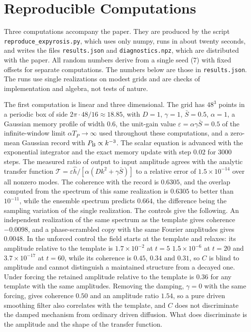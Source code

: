 \documentclass[11pt]{article}
\theoremstyle{definition}
\theoremstyle{remark}
\newcommand{\TT}{\mathcal{T}}
\newcommand{\Sb}{\bar{S}}
\begin{document}
\section{Reproducible Computations}\label{sec:computations}

Three computations accompany the paper. They are produced by the script \texttt{reproduce\_expyrosis.py}, which uses only numpy, runs in about twenty seconds, and writes the files \texttt{results.json} and \texttt{diagnostics.npz}, which are distributed with the paper. All random numbers derive from a single seed (7) with fixed offsets for separate computations. The numbers below are those in \texttt{results.json}. The runs use single realizations on modest grids and are checks of implementation and algebra, not tests of nature.

The first computation is linear and three dimensional. The grid has $48^3$ points in a periodic box of side $2\pi\cdot48/16\approx18.85$, with $D=1$, $\gamma=1$, $\Sb=0.5$, $\alpha=1$, a Gaussian memory profile of width $0.6$, the unit-gain value $\varepsilon=\alpha\gamma\Sb=0.5$ of the infinite-window limit $\alpha T_P\to\infty$ used throughout these computations, and a zero-mean Gaussian record with $P_{\rm B}\propto k^{-3}$. The scalar equation is advanced with the exponential integrator and the exact memory update with step $0.02$ for $3000$ steps. The measured ratio of output to input amplitude agrees with the analytic transfer function $\TT=\varepsilon\hat h/[\alpha(Dk^2+\gamma\Sb)]$ to a relative error of $1.5\times10^{-14}$ over all nonzero modes. The coherence with the record is $0.6305$, and the overlap computed from the spectrum of this same realization is $0.6305$ to better than $10^{-11}$, while the ensemble spectrum predicts $0.664$, the difference being the sampling variation of the single realization. The controls give the following. An independent realization of the same spectrum as the template gives coherence $-0.0098$, and a phase-scrambled copy with the same Fourier amplitudes gives $0.0048$. In the unforced control the field starts at the template and relaxes: its amplitude relative to the template is $1.7\times10^{-2}$ at $t=5$ $1.5\times10^{-6}$ at $t=20$ and $3.7\times10^{-17}$ at $t=60$, while its coherence is $0.45$, $0.34$ and $0.31$, so $C$ is blind to amplitude and cannot distinguish a maintained structure from a decayed one. Under forcing the retained amplitude relative to the template is $0.36$ for any template with the same amplitudes. Removing the damping, $\gamma=0$ with the same forcing, gives coherence $0.50$ and an amplitude ratio $1.54$, so a pure driven smoothing filter also correlates with the template, and $C$ does not discriminate the damped mechanism from ordinary driven diffusion. What does discriminate is the amplitude and the shape of the transfer function.
\end{document}
